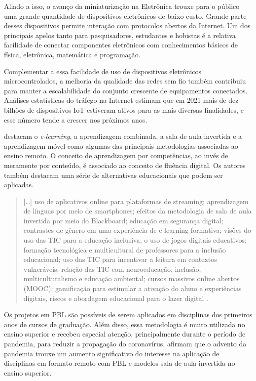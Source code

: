\documentclass[portuguese]{textolivre}
\begin{document}
Aliado a isso, o avanço da miniaturização na Eletrônica trouxe para o público uma grande quantidade de dispositivos eletrônicos de baixo custo. Grande parte desses dispositivos permite interação com protocolos abertos da Internet. Um dos principais apelos tanto para pesquisadores, estudantes e hobistas é a relativa facilidade de conectar componentes eletrônicos com conhecimentos básicos de física, eletrônica, matemática e programação. 

Complementar a essa facilidade de uso de dispositivos eletrônicos microcontrolados, a melhoria da qualidade das redes sem fio também contribuiu para manter a escalabilidade do conjunto crescente de equipamentos conectados. Análises estatísticas do tráfego na Internet \cite{jovanovic_internet_nodate} estimam que em 2021 mais de dez bilhões de dispositivos IoT estiveram ativos para as mais diversas finalidades, e esse número tende a crescer nos próximos anos.

\textcite{romero_tecnologias_2020} destacam o \textit{e-learning}, a aprendizagem combinada, a sala de aula invertida e a aprendizagem móvel como algumas das principais metodologias associadas ao ensino remoto. O conceito de aprendizagem por competências, ao invés de meramente por conteúdo, é associado ao conceito de fluência digital. Os autores também destacam uma série de alternativas educacionais que podem ser aplicadas.

\begin{quote}
    […] uso de aplicativos online para plataformas de streaming; aprendizagem de línguas por meio de smartphones; efeitos da metodologia de sala de aula invertida por meio do Blackboard; educação em segurança digital; contrastes de gênero em uma experiência de e-learning formativa; visões do uso das TIC para a educação inclusiva; o uso de jogos digitais educativos; formação tecnológica e multicultural de professores para a inclusão educacional; uso das TIC para incentivar a leitura em contextos vulneráveis; relação das TIC com neuroeducação, inclusão, multiculturalismo e educação ambiental; cursos massivos online abertos (MOOC); gamificação para estimular a ativação do aluno e experiências digitais, riscos e abordagem educacional para o lazer digital \cite[p. i]{romero_tecnologias_2020}.
\end{quote}

Os projetos em PBL são possíveis de serem aplicados em disciplinas dos primeiros anos de cursos de graduação. Além disso, essa metodologia é muito utilizada no ensino superior e recebeu especial atenção, principalmente durante o período de pandemia, para reduzir a propagação do coronavírus. \textcite{inoue_planning_2020} afirmam que o advento da pandemia trouxe um aumento significativo do interesse na aplicação de disciplinas em formato remoto com PBL e modelos sala de aula invertida no ensino superior.
\end{document}
